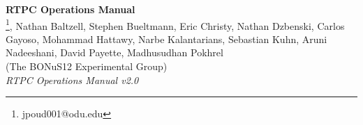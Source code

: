 \makeatletter
\begin{titlepage}
	\begin{center}
		\textbf{\huge RTPC Operations Manual}\\
		\vspace{1cm}
		{\large \@author}\footnote{jpoud001@odu.edu}, {\large Nathan Baltzell}, {\large Stephen Bueltmann}, {\large Eric Christy},  {\large Nathan Dzbenski}, {\large Carlos Gayoso}, {\large Mohammad Hattawy}, {\large Narbe Kalantarians}, {\large Sebastian Kuhn}, {\large Aruni Nadeeshani}, {\large David Payette}, {\large Madhusudhan Pokhrel}\\
		\vspace{0.2cm}
		{\Large (The BONuS12 Experimental Group)}\\
		\vspace{0.5cm}
		{\it RTPC Operations Manual v2.0}\\
		\vspace{0.2cm}
		\@date
	\end{center}
\vspace{2cm}

\begin{abstract}
	This document provides an overview of the Radial Time Projection Chamber (RTPC) system and serves as an Operations Manual for the detector. Instructions are provided for shift takers related to the basic steps of operating and monitoring the HV controls, monitoring the detector system and responding to alarms, and knowing when to contact the on-call personnel. More complete details are also provided for RTPC system experts regarding the channel mapping to the readout electronics, the cable connections and routing in Hall B, LV controls, and detector servicing. This document also provides references to the available RTPC documentation and a list of personnel authorized to perform RTPC system repairs and to modify system settings.
\end{abstract}

\end{titlepage}
\makeatother